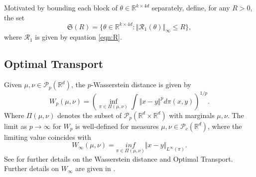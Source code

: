 \documentclass{article}
\newcommand{\R}{\mathbb{R}}
\begin{document}
\begin{appendices}
Motivated by bounding each block of $\theta \in \R^{k\times 4d}$ separately, define, for any $R>0$, the set 
\begin{equation}\label{eqn:mathfrak_S}
    \mathfrak{S}(R) = \{ \theta \in \R^{k\times 4d}: \Vert \mathcal R_1(\theta)\Vert_\infty \le R\},
\end{equation}
where $\mathcal R_1$ is given by equation \eqref{eqn:R}.
\subsection{Optimal Transport}
Given $\mu,\nu \in \mathcal P_p(\R^d)$, the $p$-Wasserstein distance is given by
\[
 W_{p}(\mu,\nu) =\left(\inf_{\pi\in \Pi(\mu,\nu)}\int \Vert x-y\Vert^p d\pi(x,y)\right)^{1/p}.
\]
Where $\Pi(\mu,\nu)$ denotes the subset of $\mathcal P_p(\R^d\times \R^d)$ with marginals $\mu,\nu$.
The limit as $p\to \infty$ for $ W_{p}$ is well-defined for measures $\mu,\nu \in \mathcal P_c(\R^d)$, where the limiting value coincides with
\[
 W_{\infty}(\mu,\nu) = \underset{\pi\in \Pi(\mu,\nu)}{inf} \Vert x-y\Vert_{L^{\infty}(\pi)}.
\]
See \cite{villani2008optimal} for further details on the Wasserstein distance and Optimal Transport. Further details on $ W_{\infty}$ are given in \cite{santambrogio2015optimal}. 

\end{appendices}
\end{document}
